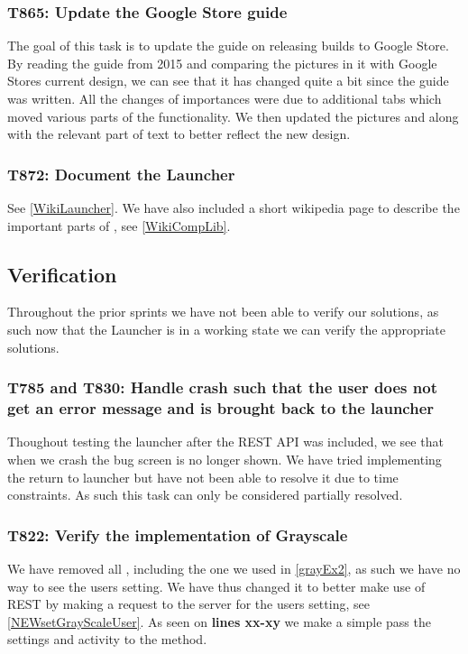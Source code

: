 \subsubsection{T865: Update the Google Store guide}

The goal of this task is to update the guide on releasing builds to Google
Store. By reading the guide from 2015 and comparing the pictures in it with
Google Stores current design, we can see that it has changed quite a bit since
the guide was written. All the changes of importances were due to additional
tabs which moved various parts of the functionality. We then updated the
pictures and along with the relevant part of text to better reflect the new
design.

\subsubsection{T872: Document the Launcher}

See \autoref{WikiLauncher}.
We have also included a short wikipedia page to describe the important parts of
, see \autoref{WikiCompLib}.


\subsection{Verification}
Throughout the prior sprints we have not been able to verify our solutions, as
such now that the Launcher is in a working state we can verify the appropriate
solutions.

\subsubsection{T785 and T830: Handle crash such that the user does not get an
error message and is brought back to the launcher}
Thoughout testing the launcher after the REST API was included, we see that when
we crash the bug screen is no longer shown. We have tried implementing the
return to launcher but have not been able to resolve it due to time constraints.
As such this task can only be considered partially resolved.

\subsubsection{T822: Verify the implementation of Grayscale}
We have removed all , including the one we used in
\autoref{grayEx2}, as such we have no way to see the users setting. We have thus
changed it to better make use of REST by making a request to the server for the
users setting, see \autoref{NEWsetGrayScaleUser}. As seen on \textbf{lines
xx-xy} we make a simple  pass the settings and activity to the
 method.\nl

